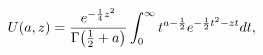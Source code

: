 \[\mathop{U\/}\nolimits\!\left(a,z\right)=\frac{e^{-\frac{1}{4}z^{2}}}{\mathop{%
\Gamma\/}\nolimits\!\left(\frac{1}{2}+a\right)}\int_{0}^{\infty}t^{a-\frac{1}{%
2}}e^{-\frac{1}{2}t^{2}-zt}dt,\]